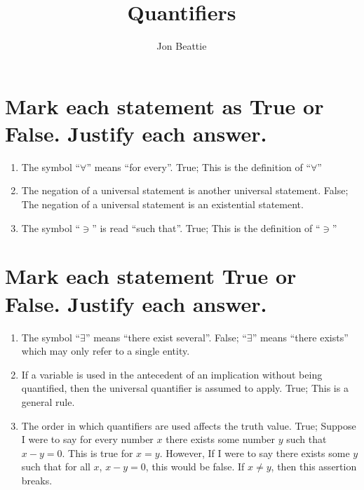 \documentclass[11pt]{article} %
\title{Quantifiers}
\author{Jon Beattie}
\begin{document}
\maketitle

\section{Mark each statement as True or False. Justify each answer.}
\begin{enumerate}
\item The symbol ``$\forall$'' means ``for every''.
\subitem True; This is the definition of ``$\forall$''
\item The negation of a universal statement is another universal statement.
\subitem False; The negation of a universal statement is an existential statement.
\item The symbol ``$\ni$'' is read ``such that''.
\subitem True; This is the definition of ``$\ni$''
\end{enumerate}

\section{Mark each statement True or False. Justify each answer.}
\begin{enumerate}
\item The symbol ``$\exists$'' means ``there exist several''.
\subitem False; ``$\exists$'' means ``there exists'' which may only refer to a single entity.
\item If a variable is used in the antecedent of an implication without being quantified, then the universal quantifier is assumed to apply.
\subitem True; This is a general rule.
\item The order in which quantifiers are used affects the truth value.
\subitem True; Suppose I were to say for every number $x$ there exists some number $y$ such that $x-y=0$. This is true for $x=y$. However, If I were to say there exists some $y$ such that for all $x$, $x-y=0$, this would be false. If $x\neq y$, then this assertion breaks.
\end{enumerate}
\end{document}
